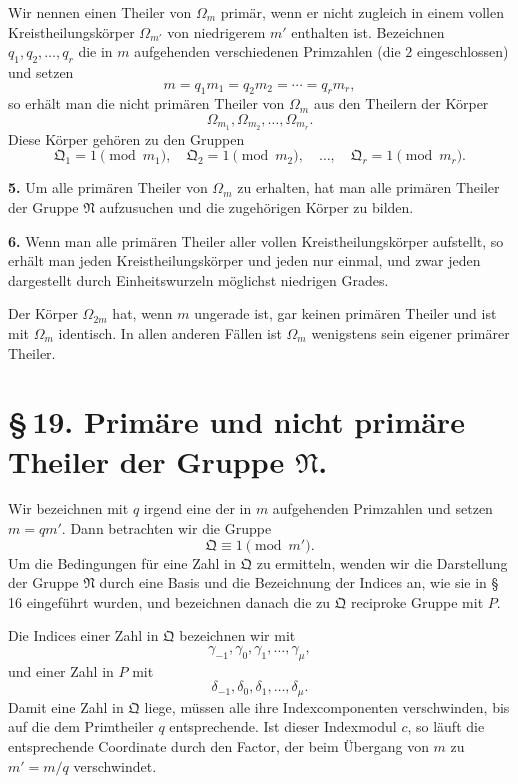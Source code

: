 \documentclass[11pt]{article}
\providecommand{\grpN}{\mathfrak N}
\providecommand{\grpQ}{\mathfrak Q}
\begin{document}
Wir nennen einen Theiler von $\Omega_m$ primär, wenn er nicht zugleich in einem vollen Kreistheilungskörper $\Omega_{m'}$ von niedrigerem $m'$ enthalten ist. Bezeichnen $q_1,q_2,
\ldots,q_r$ die in $m$ aufgehenden verschiedenen Primzahlen (die $2$ eingeschlossen) und setzen
\begin{equation}
 m=q_1m_1=q_2m_2=\cdots=q_rm_r,
\tag{8}
\end{equation}
so erhält man die nicht primären Theiler von $\Omega_m$ aus den Theilern der Körper
\begin{equation}
 \Omega_{m_1},\Omega_{m_2},\ldots,\Omega_{m_r}.
\tag{9}
\end{equation}
Diese Körper gehören zu den Gruppen
\begin{equation}
 \grpQ_1=1\pmod {m_1},\quad
 \grpQ_2=1\pmod {m_2},\quad
 \ldots,
 \quad\grpQ_r=1\pmod {m_r}.
\tag{10}
\end{equation}

\medskip
\noindent\textbf{5.} Um alle primären Theiler von $\Omega_m$ zu erhalten, hat man alle primären Theiler der Gruppe $\grpN$ aufzusuchen und die zugehörigen Körper zu bilden.

\medskip
\noindent\textbf{6.} Wenn man alle primären Theiler aller vollen Kreistheilungskörper aufstellt, so erhält man jeden Kreistheilungskörper und jeden nur einmal, und zwar jeden dargestellt durch Einheitswurzeln möglichst niedrigen Grades.

Der Körper $\Omega_{2m}$ hat, wenn $m$ ungerade ist, gar keinen primären Theiler und ist mit $\Omega_m$ identisch. In allen anderen Fällen ist $\Omega_m$ wenigstens sein eigener primärer Theiler.

\section*{\S\,19. Primäre und nicht primäre Theiler der Gruppe $\grpN$.}

Wir bezeichnen mit $q$ irgend eine der in $m$ aufgehenden Primzahlen und setzen $m=qm'$. Dann betrachten wir die Gruppe
\[
 \grpQ\equiv1\pmod {m'}.
\]
Um die Bedingungen für eine Zahl in $\grpQ$ zu ermitteln, wenden wir die Darstellung der Gruppe $\grpN$ durch eine Basis und die Bezeichnung der Indices an, wie sie in \S\,16 eingeführt wurden, und bezeichnen danach die zu $\grpQ$ reciproke Gruppe mit $P$.

Die Indices einer Zahl in $\grpQ$ bezeichnen wir mit
\[
 \gamma_{-1},\gamma_0,\gamma_1,
\ldots,
\gamma_\mu,
\]
und einer Zahl in $P$ mit
\[
 \delta_{-1},\delta_0,\delta_1,
\ldots,
\delta_\mu.
\]
Damit eine Zahl in $\grpQ$ liege, müssen alle ihre Indexcomponenten verschwinden, bis auf die dem Primtheiler $q$ entsprechende. Ist dieser Indexmodul $c$, so läuft die entsprechende Coordinate durch den Factor, der beim Übergang von $m$ zu $m'=m/q$ verschwindet.
\end{document}
